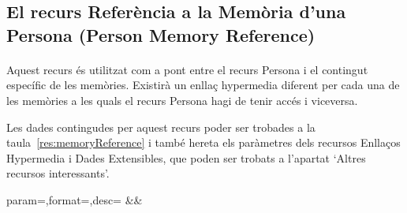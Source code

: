 \subsection{El recurs Referència a la Memòria d'una Persona (Person Memory Reference)}

    \paragraph{}
    Aquest recurs és utilitzat com a pont entre el recurs Persona i el contingut específic de les memòries. Existirà un enllaç hypermedia diferent per cada una de les memòries a les quals el recurs Persona hagi de tenir accés i viceversa.

    Les dades contingudes per aquest recurs poder ser trobades a la taula~\ref{res:memoryReference} i també hereta els paràmetres dels recursos Enllaços Hypermedia i Dades Extensibles, que poden ser trobats a l'apartat `Altres recursos interessants'.

    \begin{center}
             {param=\param,format=\format,desc=\desc}
             {\param&\format&\desc}
     \end{center}

